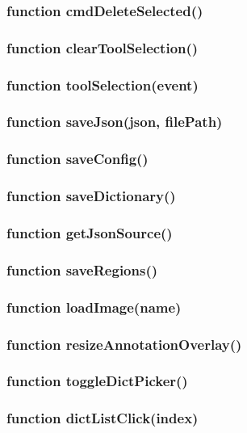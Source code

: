 \subsubsection{function cmdDeleteSelected()}
\subsubsection{function clearToolSelection()}
\subsubsection{function toolSelection(event)}

\subsubsection{function saveJson(json, filePath)}
\subsubsection{function saveConfig()}
\subsubsection{function saveDictionary()}
\subsubsection{function getJsonSource()}
\subsubsection{function saveRegions()}

\subsubsection{function loadImage(name)}
\subsubsection{function resizeAnnotationOverlay()}


\subsubsection{function toggleDictPicker()}
\subsubsection{function dictListClick(index)}


